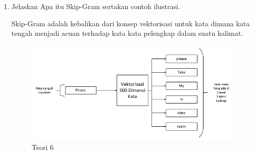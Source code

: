 \begin{enumerate}
\item Jelaskan Apa itu Skip-Gram sertakan contoh ilustrasi. \par
Skip-Gram adalah kebalikan dari konsep vektorisasi untuk kata dimana kata tengah menjadi acuan terhadap kata kata pelengkap dalam suatu kalimat.

\begin{figure}[ht]
\centering
\includegraphics[scale=0.6]{figures/1174042/chapter5/1,6.PNG}
\caption{Teori 6}
\label{contoh}
\end{figure}

\end{enumerate}
